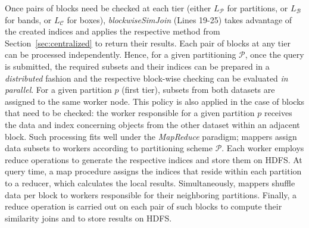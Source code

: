 Once pairs of blocks need be checked at each tier (either $L_{\mathcal{P}}$ for partitions, or $L_{\mathcal{B}}$ for bands, or $L_{\mathcal{C}}$ for boxes), {\em blockwiseSimJoin} (Lines 19-25) takes advantage of the created indices and applies the respective method from Section~\ref{sec:centralized} to return their results. Each pair of blocks at any tier can be processed independently. Hence, for a given partitioning $\mathcal{P}$, once the query is submitted, the required subsets and their indices can be prepared in a {\em distributed} fashion and the respective block-wise checking can be evaluated {\em in parallel}. For a given partition $p$ (first tier), subsets from both datasets are assigned to the same worker node. This policy is also applied in the case of blocks that need to be checked: the worker responsible for a given partition $p$ receives the data and index concerning objects from the other dataset within an adjacent block. Such processing fits well under the {\em MapReduce} paradigm; mappers assign data subsets to workers according to partitioning scheme $\mathcal{P}$. Each worker employs reduce operations to generate the respective indices and store them on HDFS. At query time, a map procedure assigns the indices that reside within each partition to a reducer, which calculates the local results. Simultaneously, mappers shuffle data per block to workers responsible for their neighboring partitions. Finally, a reduce operation is carried out on each pair of such blocks to compute their similarity joins and to store results on HDFS.



